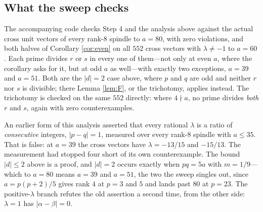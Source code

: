 \subsection*{What the sweep checks}
The accompanying code checks Step 4 and the analysis above against the actual
cross unit vectors of every rank-$8$ spindle to $a = 80$, with zero violations,
and both halves of
Corollary \ref{cor:even} on all $552$ cross vectors with $\lambda \ne -1$ to
$a = 60$. Each prime divides $r$ or $s$ in every one of them---not only at even
$a$, where the corollary asks for it, but at odd $a$ as well---with exactly two
exceptions, $a = 39$ and $a = 51$. Both are the $\lvert d \rvert = 2$ case above,
where $p$ and $q$ are odd and neither $r$ nor $s$ is divisible; there Lemma \ref{lem:F}, or the trichotomy, applies instead. The trichotomy is checked
on the same $552$ directly: where $4 \nmid a$, no prime divides \emph{both} $r$
and $s$, again with zero counterexamples.

\begin{remark}
An earlier form of this analysis asserted that every rational $\lambda$ is a ratio of
\emph{consecutive} integers, $\lvert p - q \rvert = 1$, measured over every
rank-$8$ spindle with $a \le 35$. That is false: at $a = 39$ the cross vectors have
$\lambda = -13/15$ and $-15/13$. The measurement had stopped four short of its own
counterexample. The bound $\lvert d \rvert \le 2$ above is a proof, and
$\lvert d \rvert = 2$ occurs exactly when $pq = 5a$ with $m = 1/9$---which to
$a = 80$ means $a = 39$ and $a = 51$, the two the sweep singles out, since
$a = p(p+2)/5$ gives rank $4$ at $p = 3$ and $5$ and lands past $80$ at $p = 23$.
The positive-$\lambda$ branch refutes the old assertion a second time, from the other
side: $\lambda = 1$ has $\lvert \alpha - \beta \rvert = 0$.
\end{remark}
